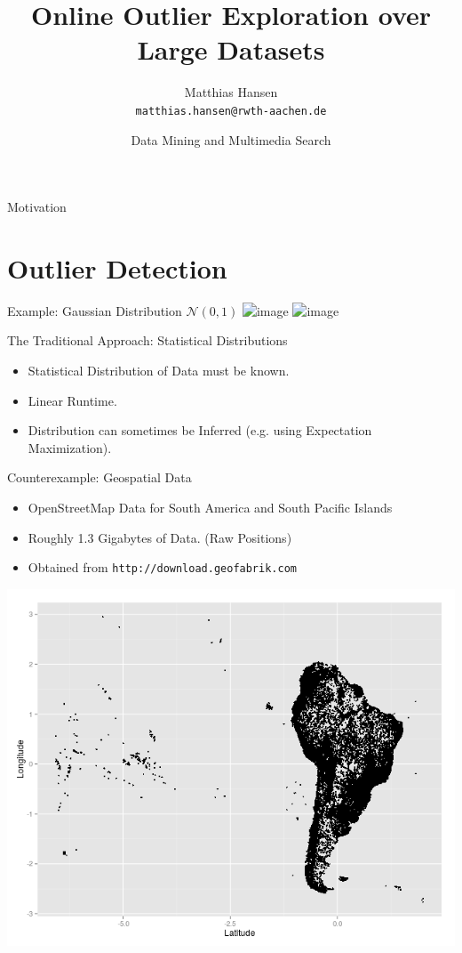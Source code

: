 \documentclass{beamer}
\title{Online Outlier Exploration over Large Datasets}
\author{Matthias Hansen \\
        \texttt{matthias.hansen@rwth-aachen.de}}
\date{Data Mining and Multimedia Search}
\institute{RWTH Aachen University}
\begin{document}
\frame{\titlepage}

\begin{frame}{Motivation}
\end{frame}
\section{Outlier Detection}
\begin{frame}{Example: Gaussian Distribution $\mathcal{N}(0,1)$}
    \centering
    \includegraphics<1>[width=.7\textwidth]{images/gaussian.png}
    \includegraphics<2>[width=.7\textwidth]{images/gaussian_lines.png}

\end{frame}
\begin{frame}{The Traditional Approach: Statistical Distributions}
    \begin{itemize}
        \item Statistical Distribution of Data must be known.
        \item Linear Runtime.
        \item Distribution can sometimes be Inferred (e.g. using Expectation Maximization).
    \end{itemize}
\end{frame}
\begin{frame}{Counterexample: Geospatial Data}
    \begin{itemize}
        \item OpenStreetMap Data for South America and South Pacific Islands

        \item Roughly 1.3 Gigabytes of Data. (Raw Positions)

        \item Obtained from \texttt{http://download.geofabrik.com}
    \end{itemize}
    \begin{center}
    \includegraphics[width=.7\textwidth]{images/south_america.png} 
    \end{center}
\end{frame}
\end{document}
